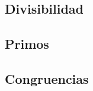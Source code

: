 \subsection{Divisibilidad}\label{subsec:divisibilidad}


\subsection{Primos}\label{subsec:primos}


\subsection{Congruencias}\label{subsec:congruencias}



